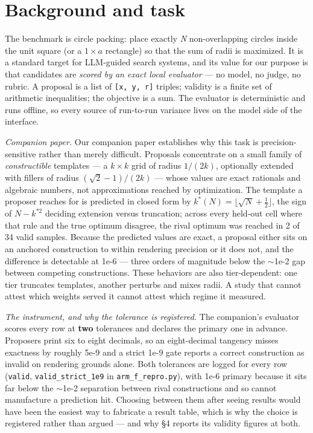 \documentclass[11pt]{article}
\begin{document}
\section{Background and task}

The benchmark is circle packing: place exactly \emph{N} non-overlapping circles inside the
unit square (or a $1 \times a$ rectangle) so that the sum of radii is maximized. It is a
standard target for LLM-guided search systems, and its value for our purpose is that
candidates are \emph{scored by an exact local evaluator} --- no model, no judge, no rubric. A
proposal is a list of \texttt{[x, y, r]} triples; validity is a finite set of arithmetic
inequalities; the objective is a sum. The evaluator is deterministic and runs offline,
so every source of run-to-run variance lives on the model side of the interface.

\emph{Companion paper.} Our companion paper establishes why this task is precision-sensitive
rather than merely difficult. Proposals concentrate on a small family of
\emph{constructible} templates --- a $k \times k$ grid of radius $1/(2k)$, optionally extended with
fillers of radius $(\sqrt{2} - 1)/(2k)$ --- whose values are exact rationals and algebraic
numbers, not approximations reached by optimization. The template a proposer reaches
for is predicted in closed form by $k^*(N) = \lfloor \sqrt{N} + \tfrac{1}{2} \rfloor$, the sign of $N - k^{*2}$ deciding
extension versus truncation; across every held-out cell where that rule and the true
optimum disagree, the rival optimum was reached in 2 of 34 valid samples. Because the
predicted values are exact, a proposal either sits on an anchored construction to
within rendering precision or it does not, and the difference is detectable at 1e-6 ---
three orders of magnitude below the $\sim$1e-2 gap between competing constructions. These
behaviors are also tier-dependent: one tier truncates templates, another perturbs and
mixes radii. A study that cannot attest which weights served it cannot attest which
regime it measured.

\emph{The instrument, and why the tolerance is registered.} The companion's evaluator scores
every row at \textbf{two} tolerances and declares the primary one in advance. Proposers print
six to eight decimals, so an eight-decimal tangency misses exactness by roughly 5e-9 and
a strict 1e-9 gate reports a correct construction as invalid on rendering grounds alone.
Both tolerances are logged for every row (\texttt{valid}, \texttt{valid\_strict\_1e9} in
\texttt{arm\_f\_repro.py}), with 1e-6 primary because it sits far below the $\sim$1e-2 separation
between rival constructions and so cannot manufacture a prediction hit. Choosing between
them after seeing results would have been the easiest way to fabricate a result table,
which is why the choice is registered rather than argued --- and why \S4 reports its
validity figures at both.
\end{document}

